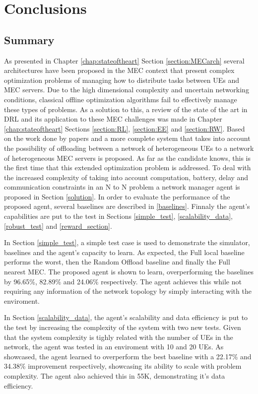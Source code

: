 \chapter{Conclusions}
\section{Summary}
\noindent As presented in Chapter \ref{chap:stateoftheart} Section \ref{section:MECarch} several architectures have been proposed in the \acrshort{MEC} context that present complex optimization problems of managing how to distribute tasks between \acrshort{UE}s and \acrshort{MEC} servers. Due to the high dimensional complexity and uncertain networking conditions, classical offline optimization algorithms fail to effectively manage these types of problems. As a solution to this, a review of the state of the art in \acrshort{DRL} and its application to these \acrshort{MEC} challenges was made in Chapter \ref{chap:stateoftheart} Sections \ref{section:RL}, \ref{section:EE} and \ref{section:RW}. Based on the work done by papers \cite{NUE1mec} and \cite{taskclass1} a more complete system that takes into account the possibility of offloading between a network of heterogeneous \acrshort{UE}s to a network of heterogeneous \acrshort{MEC} servers is proposed. As far as the candidate knows, this is the first time that this extended optimization problem is addressed. To deal with the increased complexity of taking into account computation, battery, delay and communication constraints in an N to N problem a network manager agent is proposed in Section \ref{solution}. In order to evaluate the performance of the proposed agent, several baselines are described in \ref{baselines}. Finnaly the agent's capabilities are put to the test in Sections \ref{simple_test}, \ref{scalability_data}, \ref{robust_test} and \ref{reward_section}.

In Section \ref{simple_test}, a simple test case is used to demonstrate the simulator, baselines and the agent's capacity to learn. As expected, the Full local baseline performs the worst, then the Random Offload baseline and finally the Full nearest MEC. The proposed agent is shown to learn, overperforming the baselines by 96.65\%, 82.89\% and 24.06\% respectively. The agent achieves this while not requiring any information of the network topology by simply interacting with the enviroment.

In Section \ref{scalability_data}, the agent's scalability and data efficiency is put to the test by increasing the complexity of the system with two new tests. Given that the system complexity is tighly related with the number of \acrshort{UE}s in the network, the agent was tested in an enviroment with 10 and 20 \acrshort{UE}s. As showcased, the agent learned to overperform the best baseline with a 22.17\% and 34.38\% improvement respectively, showcasing its ability to scale with problem complexity. The agent also achieved this in 55K, demonstrating it's data efficiency.

